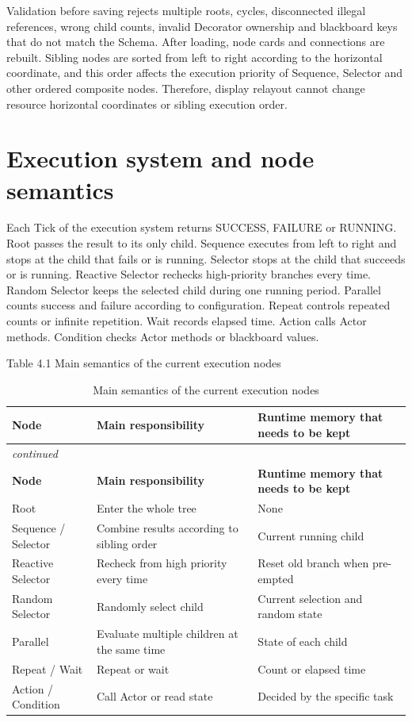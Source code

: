 Validation before saving rejects multiple roots, cycles, disconnected illegal references, wrong child counts, invalid Decorator ownership and blackboard keys that do not match the Schema. After loading, node cards and connections are rebuilt. Sibling nodes are sorted from left to right according to the horizontal coordinate, and this order affects the execution priority of Sequence, Selector and other ordered composite nodes. Therefore, display relayout cannot change resource horizontal coordinates or sibling execution order.

\section{Execution system and node semantics}

Each Tick of the execution system returns SUCCESS, FAILURE or RUNNING. Root passes the result to its only child. Sequence executes from left to right and stops at the child that fails or is running. Selector stops at the child that succeeds or is running. Reactive Selector rechecks high-priority branches every time. Random Selector keeps the selected child during one running period. Parallel counts success and failure according to configuration. Repeat controls repeated counts or infinite repetition. Wait records elapsed time. Action calls Actor methods. Condition checks Actor methods or blackboard values.

Table 4.1 Main semantics of the current execution nodes

\begin{center}

\begin{longtable}{@{}p{} p{} p{}@{}}
\caption{Main semantics of the current execution nodes}\label{tab:runtime-node-semantics}\\
\toprule
\textbf{Node} & \textbf{Main responsibility} & \textbf{Runtime memory that needs to be kept} \\
\midrule
\endfirsthead
\multicolumn{3}{l}{\itshape continued}\\
\toprule
\textbf{Node} & \textbf{Main responsibility} & \textbf{Runtime memory that needs to be kept} \\
\midrule
\endhead
Root & Enter the whole tree & None \\
Sequence / Selector & Combine results according to sibling order & Current running child \\
Reactive Selector & Recheck from high priority every time & Reset old branch when pre-empted \\
Random Selector & Randomly select child & Current selection and random state \\
Parallel & Evaluate multiple children at the same time & State of each child \\
Repeat / Wait & Repeat or wait & Count or elapsed time \\
Action / Condition & Call Actor or read state & Decided by the specific task \\
\bottomrule
\end{longtable}
\end{center}

